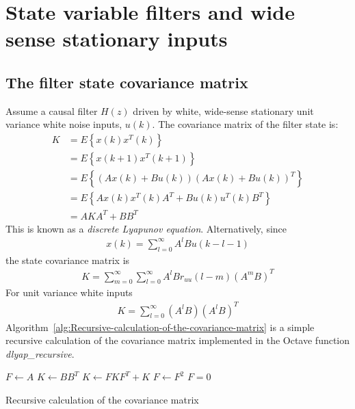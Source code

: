 \documentclass[a4paper,twoside,10pt,english]{report}
\begin{document}
\section{State variable filters and wide sense stationary inputs}
\subsection{The filter state covariance matrix}
Assume a causal filter $H\left(z\right)$ driven by white, wide-sense stationary
unit variance white noise inputs, $u\left(k\right)$. The covariance matrix of 
the filter state is:
\begin{align*}
K &= E\left\{x\left(k\right)x^{T}\left(k\right)\right\}\\
 &= E\left\{x\left(k+1\right)x^{T}\left(k+1\right)\right\}\\
 &= E\left\{\left(Ax\left(k\right)+Bu\left(k\right)\right)\left(Ax\left(k\right)+Bu\left(k\right)\right)^{T}\right\}\\
 &= E\left\{Ax\left(k\right)x^{T}\left(k\right)A^{T}+Bu\left(k\right)u^{T}\left(k\right)B^{T}\right\}\\
 &= AKA^{T}+BB^{T}
\end{align*}
This is known as a \emph{discrete Lyapunov equation}. Alternatively, since
\begin{align*}
x\left(k\right) = \sum_{l=0}^{\infty}A^{l}Bu\left(k-l-1\right)
\end{align*}
the state covariance matrix is
\begin{align*}
K = \sum_{m=0}^{\infty}\sum_{l=0}^{\infty}A^{l}Br_{uu}\left(l-m\right)\left(A^{m}B\right)^{T}
\end{align*}
For unit variance white inputs
\begin{align*}
K = \sum_{l=0}^{\infty}\left(A^{l}B\right)\left(A^{l}B\right)^{T}
\end{align*}
Algorithm~\ref{alg:Recursive-calculation-of-the-covariance-matrix} is a 
simple recursive calculation of the covariance matrix implemented in 
the Octave function \emph{dlyap\_recursive}.
\begin{algorithm}
\begin{algorithmic}
\State $F \leftarrow A$
\State $K \leftarrow BB^{T}$
\Repeat
  \State $K \leftarrow FKF^{T}+K$
  \State $F \leftarrow F^{2}$
\Until $F=0$
\end{algorithmic}
\caption{Recursive calculation of the covariance matrix}
\label{alg:Recursive-calculation-of-the-covariance-matrix}
\end{algorithm}
\end{document}

